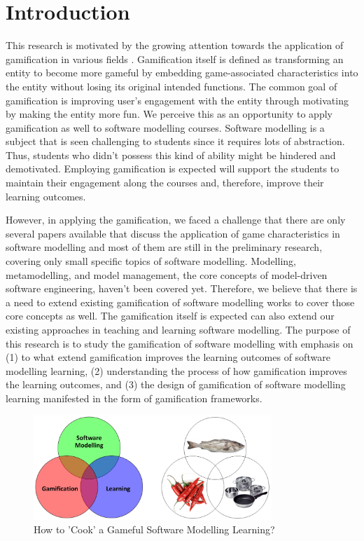 \documentclass[12pt, a4paper]{report}
\begin{document}
\chapter{Introduction}



This research is motivated by the growing attention towards the application of gamification in various fields \cite{kolovos2015eugenia}. Gamification itself is defined as transforming an entity to become more gameful by embedding game-associated characteristics into the entity without losing its original intended functions. The common goal of gamification is improving user’s engagement with the entity through motivating by making the entity more fun. We perceive this as an opportunity to apply gamification as well to software modelling courses. Software modelling is a subject that is seen challenging to students since it requires lots of abstraction. Thus, students who didn’t possess this kind of ability might be hindered and demotivated. Employing gamification is expected will support the students to maintain their engagement along the courses and, therefore, improve their learning outcomes. 

However, in applying the gamification, we faced a challenge that there are only several papers available that discuss the application of game characteristics in software modelling and most of them are still in the preliminary research, covering only small specific topics of software modelling. Modelling, metamodelling, and model management, the core concepts of model-driven software engineering, haven’t been covered yet.  Therefore, we believe that there is a need to extend existing gamification of software modelling works to cover those core concepts as well. The gamification itself is expected can also extend our existing approaches in teaching and learning software modelling. The purpose of this research is to study the gamification of software modelling with emphasis on (1) to what extend gamification improves the learning outcomes of software modelling learning, (2) understanding the process of how gamification improves the learning outcomes, and (3) the design of gamification of software modelling learning manifested in the form of gamification frameworks.

\begin{figure}[ht]
\centering
\includegraphics[width=9cm]{smlg}
\caption{How to 'Cook' a Gameful Software Modelling Learning?}
\label{fig:smlg}
\end{figure}
\end{document}
